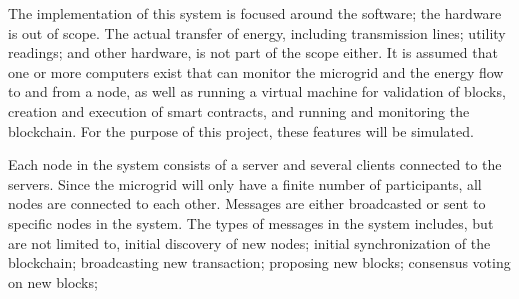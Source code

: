 The implementation of this system is focused around the software; the hardware is out of scope. The actual transfer of energy, including transmission lines; utility readings; and other hardware, is not part of the scope either. It is assumed that one or more computers exist that can monitor the microgrid and the energy flow to and from a node, as well as running a virtual machine for validation of blocks, creation and execution of smart contracts, and running and monitoring the blockchain. For the purpose of this project, these features will be simulated.

Each node in the system consists of a server and several clients connected to the servers. Since the microgrid will only have a finite number of participants, all nodes are connected to each other. Messages are either broadcasted or sent to specific nodes in the system. The types of messages in the system includes, but are not limited to, initial discovery of new nodes; initial synchronization of the blockchain; broadcasting new transaction; proposing new blocks; consensus voting on new blocks; 






